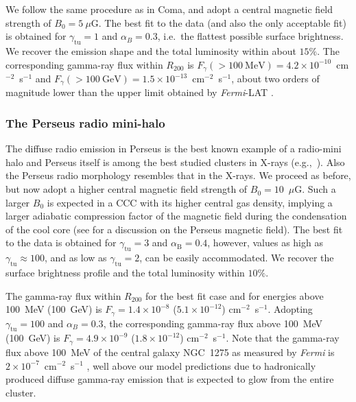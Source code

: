 \documentclass[traditabstract]{aa}
\newcommand{\rmn}{\mathrm}
\begin{document}
We follow the same procedure as in Coma, and adopt a central magnetic field
strength of $B_{0}=5~\mu$G. The best fit to the data (and also the only
acceptable fit) is obtained for $\gamma_{\rmn{tu}}=1$ and $\alpha_B=0.3$,
i.e.~the flattest possible surface brightness. We recover the emission shape and
the total luminosity within about $15\%$. The corresponding gamma-ray flux
within $R_{200}$ is $F_{\gamma} (>100~\rmn{MeV}) = 4.2 \times
10^{-10}$~cm$^{-2}$~s$^{-1}$ and $F_{\gamma} (>100~\rmn{GeV}) =1.5 \times
10^{-13}$~cm$^{-2}$~s$^{-1}$, about two orders of magnitude lower than the upper
limit obtained by \emph{Fermi}-LAT \citep{2010ApJ...717L..71A}.


\subsubsection{The Perseus radio mini-halo}

The diffuse radio emission in Perseus is the best known example of a radio-mini
halo \citep{1990MNRAS.246..477P} and Perseus itself is among the best studied
clusters in X-rays
(e.g.,~\citealp{2003ApJ...590..225C,2006MNRAS.366..417F,2011arXiv1105.5025F}). Also
the Perseus radio morphology resembles that in the X-rays. We proceed as before,
but now adopt a higher central magnetic field strength of
$B_{0}=10$~$\mu$G. Such a larger $B_0$ is expected in a CCC with its higher
central gas density, implying a larger adiabatic compression factor of the
magnetic field during the condensation of the cool core (see
\citealp{2010ApJ...710..634A,2011arXiv1111.5544M} for a discussion on the
Perseus magnetic field). The best fit to the data is obtained for
$\gamma_{\rmn{tu}}=3$ and $\alpha_{\rmn{B}}=0.4$, however, values as high as
$\gamma_{\rmn{tu}} \approx 100$, and as low as $\gamma_{\rmn{tu}}=2$, can be
easily accommodated. We recover the surface brightness profile and the total
luminosity within $10\%$.

The gamma-ray flux within $R_{200}$ for the best fit case and for energies above
100~MeV (100~GeV) is $F_{\gamma} = 1.4 \times 10^{-8}$ ($5.1 \times 10^{-12}$)
cm$^{-2}$~s$^{-1}$. Adopting $\gamma_{\rmn{tu}}=100$ and $\alpha_B=0.3$, the
corresponding gamma-ray flux above 100~MeV (100~GeV) is $F_{\gamma} = 4.9 \times
10^{-9}$ ($1.8 \times 10^{-12}$) cm$^{-2}$~s$^{-1}$. Note that the gamma-ray
flux above 100~MeV of the central galaxy NGC~1275 as measured by \emph{Fermi} is
$2 \times 10^{-7}$~cm$^{-2}$~s$^{-1}$ \citep{2009arXiv0904.1904T}, well above
our model predictions due to hadronically produced diffuse gamma-ray emission
that is expected to glow from the entire cluster.
\end{document}
